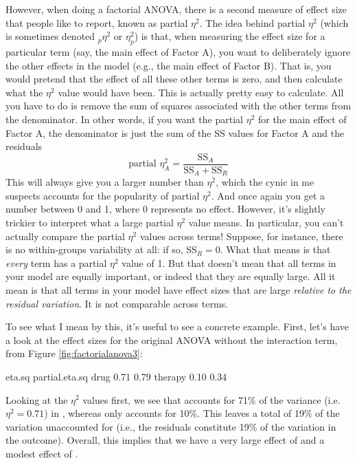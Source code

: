 However, when doing a factorial ANOVA, there is a second measure of effect size that people like to report, known as partial $\eta^2$. The idea behind partial $\eta^2$ (which is sometimes denoted $_p\eta^2$ or $\eta^2_p$) is that, when measuring the effect size for a particular term (say, the main effect of Factor A), you want to deliberately ignore the other effects in the model (e.g., the main effect of Factor B). That is, you would pretend that the effect of all these other terms is zero, and then calculate what the $\eta^2$ value would have been. This is actually pretty easy to calculate. All you have to do is remove the sum of squares associated with the other terms from the denominator. In other words, if you want the partial $\eta^2$ for the main effect of Factor A, the denominator is just the sum of the SS values for Factor A and the residuals
$$
\mbox{partial } \eta^2_A = \frac{\mbox{SS}_{A}}{\mbox{SS}_{A} + \mbox{SS}_{R}}
$$
This will always give you a larger number than $\eta^2$, which the cynic in me suspects accounts for the popularity of partial $\eta^2$. And once again you get a number between 0 and 1, where 0 represents no effect. However, it's slightly trickier to interpret what a large partial $\eta^2$ value means. In particular, you can't actually compare the partial $\eta^2$ values across terms! Suppose, for instance, there is no within-groups variability at all: if so, SS$_R = 0$. What that means is that {\it every} term has a partial $\eta^2$ value of 1. But that doesn't mean that all terms in your model are equally important, or indeed that they are equally large. All it mean is that all terms in your model have effect sizes that are large {\it relative to the residual variation}. It is not comparable across terms.

To see what I mean by this, it's useful to see a concrete example. First, let's have a look at the effect sizes for the original ANOVA without the interaction term, from Figure \ref{fig:factorialanova3}:

\begin{rblock1}
              eta.sq partial.eta.sq
drug           0.71        0.79
therapy        0.10        0.34
\end{rblock1}

Looking at the $\eta^2$ values first, we see that  accounts for 71\% of the variance (i.e. $\eta^2 = 0.71$) in , whereas  only accounts for 10\%. This leaves a total of 19\% of the variation unaccounted for (i.e., the residuals constitute 19\% of the variation in the outcome). Overall, this implies that we have a very large effect of  and a modest effect of . 

